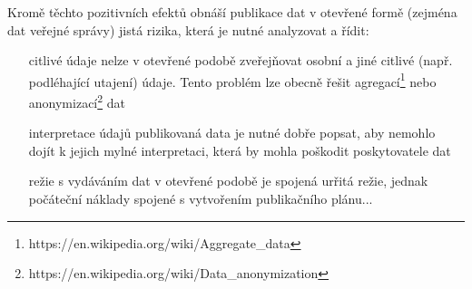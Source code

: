 Kromě těchto pozitivních efektů obnáší publikace dat v otevřené formě (zejména dat veřejné správy) jistá rizika, která je nutné analyzovat a řídit:
\begin{itemize}
	\item[citlivé údaje] nelze v otevřené podobě zveřejňovat osobní a jiné citlivé (např. podléhající utajení) údaje. Tento problém lze obecně řešit agregací\footnote{https://en.wikipedia.org/wiki/Aggregate\_data} nebo anonymizací\footnote{https://en.wikipedia.org/wiki/Data\_anonymization} dat
	\item[interpretace údajů] publikovaná data je nutné dobře popsat, aby nemohlo dojít k jejich mylné interpretaci, která by mohla poškodit poskytovatele dat
	\item[režie] s vydáváním dat v otevřené podobě je spojená urřitá režie, jednak počáteční náklady spojené s vytvořením publikačního plánu...
\end{itemize}